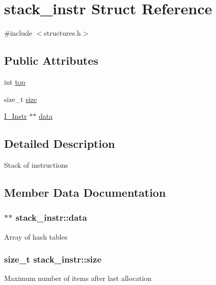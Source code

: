 \hypertarget{structstack__instr}{}\section{stack\+\_\+instr Struct Reference}
\label{structstack__instr}


{\ttfamily \#include $<$structures.\+h$>$}

\subsection*{Public Attributes}
\begin{DoxyCompactItemize}
\item 
int \hyperlink{structstack__instr_a1b85b397a6e1175d2ec961ce410ac9fa}{top}
\item 
size\+\_\+t \hyperlink{structstack__instr_a6ff7d4a9bec03ea7309c4503cd848aeb}{size}
\item 
\hyperlink{structI__Instr}{I\+\_\+\+Instr} $\ast$$\ast$ \hyperlink{structstack__instr_a7de5019066f3917d377603cdb284ac13}{data}
\end{DoxyCompactItemize}


\subsection{Detailed Description}
Stack of instructions 

\subsection{Member Data Documentation}
\hypertarget{structstack__instr_a7de5019066f3917d377603cdb284ac13}{}
\subsubsection[{data}]{$\ast$$\ast$ stack\+\_\+instr\+::data}\label{structstack__instr_a7de5019066f3917d377603cdb284ac13}
Array of hash tables \hypertarget{structstack__instr_a6ff7d4a9bec03ea7309c4503cd848aeb}{}
\subsubsection[{size}]{\setlength{\rightskip}{0pt plus 5cm}size\+\_\+t stack\+\_\+instr\+::size}\label{structstack__instr_a6ff7d4a9bec03ea7309c4503cd848aeb}
Maximum number of items after last allocation \hypertarget{structstack__instr_a1b85b397a6e1175d2ec961ce410ac9fa}{}
